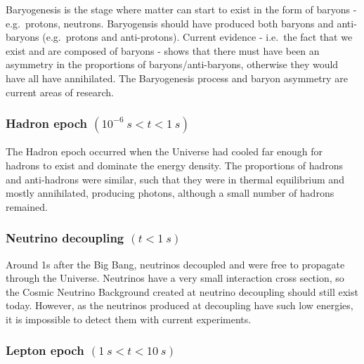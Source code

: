 \documentclass[]{book}
\begin{document}
Baryogenesis is the stage where matter can start to exist in the form of
baryons - e.g.~protons, neutrons. Baryogensis should have produced both
baryons and anti-baryons (e.g.~protons and anti-protons). Current
evidence - i.e.~the fact that we exist and are composed of baryons -
shows that there must have been an asymmetry in the proportions of
baryons/anti-baryons, otherwise they would have all have annihilated.
The Baryogenesis process and baryon asymmetry are current areas of
research.

\hypertarget{hadron-epoch-10-6s-t-1s}{%
\subsubsection*{\texorpdfstring{Hadron epoch \((10^{-6}~s < t < 1~s)\)}{Hadron epoch (10\^{}\{-6\}\textasciitilde{}s \textless{} t \textless{} 1\textasciitilde{}s)}}\label{hadron-epoch-10-6s-t-1s}}

The Hadron epoch occurred when the Universe had cooled far enough for
hadrons to exist and dominate the energy density. The proportions of
hadrons and anti-hadrons were similar, such that they were in thermal
equilibrium and mostly annihilated, producing photons, although a small
number of hadrons remained.

\hypertarget{neutrino-decoupling-t-1s}{%
\subsubsection*{\texorpdfstring{Neutrino decoupling \((t < 1~s)\)}{Neutrino decoupling (t \textless{} 1\textasciitilde{}s)}}\label{neutrino-decoupling-t-1s}}

Around 1s after the Big Bang, neutrinos decoupled and were free to
propagate through the Universe. Neutrinos have a very small interaction
cross section, so the Cosmic Neutrino Background created at neutrino
decoupling should still exist today. However, as the neutrinos produced
at decoupling have such low energies, it is impossible to detect them
with current experiments.

\hypertarget{lepton-epoch-1s-t-10s}{%
\subsubsection*{\texorpdfstring{Lepton epoch \((1~s < t < 10~s)\)}{Lepton epoch (1\textasciitilde{}s \textless{} t \textless{} 10\textasciitilde{}s)}}\label{lepton-epoch-1s-t-10s}}
\end{document}
